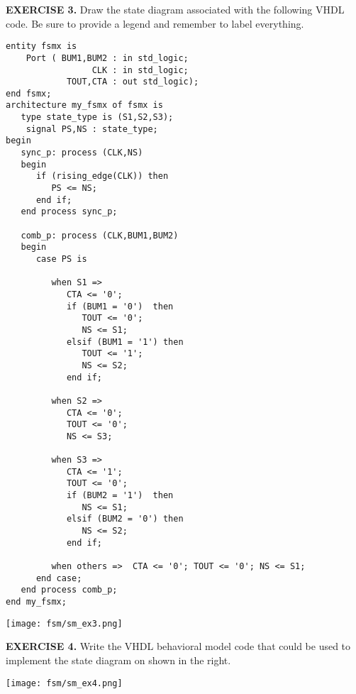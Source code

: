 \newpage\clearpage
\vspace{20pt}
\noindent
\begin{minipage}{1\textwidth}
\textbf{EXERCISE 3.}
Draw the state diagram associated with the following VHDL code. Be sure to provide a legend and remember to label everything.
\end{minipage}
\begin{minipage}{0.66\textwidth}
\vspace{10px}
\begin{lstlisting}
entity fsmx is
    Port ( BUM1,BUM2 : in std_logic;
                 CLK : in std_logic;
            TOUT,CTA : out std_logic);
end fsmx;
architecture my_fsmx of fsmx is
   type state_type is (S1,S2,S3); 
	signal PS,NS : state_type; 
begin
   sync_p: process (CLK,NS)
   begin
      if (rising_edge(CLK)) then   
         PS <= NS; 
      end if; 
   end process sync_p; 

   comb_p: process (CLK,BUM1,BUM2)
   begin
      case PS is 

         when S1 => 
            CTA <= '0'; 
            if (BUM1 = '0')  then 
               TOUT <= '0'; 
               NS <= S1; 
            elsif (BUM1 = '1') then 
               TOUT <= '1';  
               NS <= S2; 
            end if; 

         when S2 =>
            CTA <= '0'; 
            TOUT <= '0'; 
            NS <= S3;   

         when S3 =>
            CTA <= '1'; 
            TOUT <= '0';   
            if (BUM2 = '1')  then 
               NS <= S1; 
            elsif (BUM2 = '0') then 
               NS <= S2; 
            end if; 
      
         when others =>  CTA <= '0'; TOUT <= '0'; NS <= S1;
      end case; 
   end process comb_p; 
end my_fsmx;
\end{lstlisting}
\end{minipage}
\begin{minipage}{0.29\textwidth}
\texttt{[image: fsm/sm\_ex3.png]}
\vspace{250px}
\end{minipage}

\vspace{20pt}
\noindent
\begin{minipage}[t]{0.5\textwidth}
\textbf{EXERCISE 4.}
Write the VHDL behavioral model code that could be used to implement the state diagram on shown in the right.
\end{minipage}
\begin{minipage}[t]{0.47\textwidth}
\vspace{0pt}\raggedright
\centering
\texttt{[image: fsm/sm\_ex4.png]}
\end{minipage}

